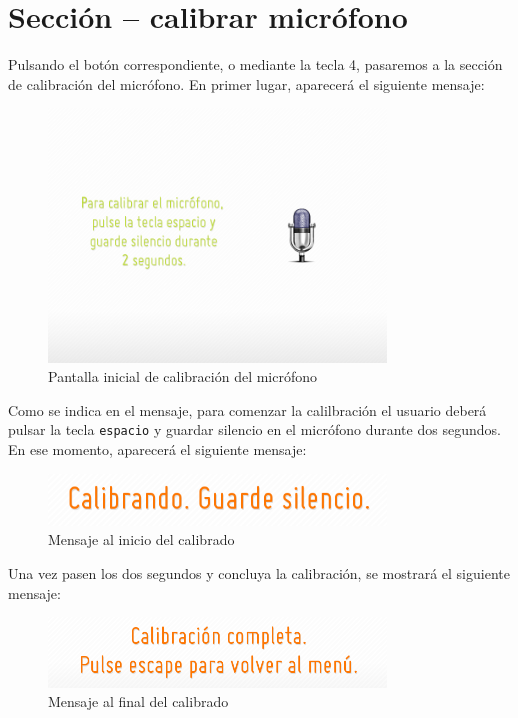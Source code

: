 \section{Sección -- calibrar micrófono}
Pulsando el botón correspondiente, o mediante la tecla 4, pasaremos a la sección
de calibración del micrófono. En primer lugar, aparecerá el siguiente mensaje:

\begin{figure}[h!]
  \vspace{-0.1cm}
  \centering
  \includegraphics[width=0.8\textwidth]{apendice_manual_usuario/imagen_seccionCalibrar1}
  \caption{Pantalla inicial de calibración del micrófono}
  \vspace{-1cm}
\end{figure}

Como se indica en el mensaje, para comenzar la calilbración el usuario deberá
pulsar la tecla \texttt{espacio} y guardar silencio en el micrófono durante dos
segundos. En ese momento, aparecerá el siguiente mensaje:

\begin{figure}[h!]
  \vspace{-0.1cm}
  \centering
  \includegraphics[width=0.8\textwidth]{apendice_manual_usuario/imagen_seccionCalibrar_mensaje1}
  \caption{Mensaje al inicio del calibrado}
\end{figure}

Una vez pasen los dos segundos y concluya la calibración, se mostrará el
siguiente mensaje:

\begin{figure}[h!]
  \vspace{-0.1cm}
  \centering
  \includegraphics[width=0.8\textwidth]{apendice_manual_usuario/imagen_seccionCalibrar_mensaje2}
  \caption{Mensaje al final del calibrado}
\end{figure}

